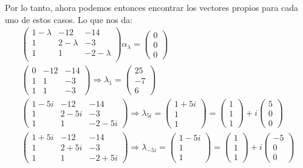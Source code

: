 \documentclass[12pt]{exam}
\begin{document}
\begin{enumerate}
\begin{enumerate}
    Por lo tanto, ahora podemos entonces encontrar los vectores propios para cada uno de estos casos. Lo que nos
    da:
    \begin{align*}
        \begin{pmatrix} 
            1 - \lambda & -12 & -14 \\
            1 & 2 - \lambda & -3 \\
            1 & 1 & - 2 - \lambda\\
        \end{pmatrix} \alpha_\lambda = \begin{pmatrix} 0\\0\\0 \end{pmatrix} \\
        \begin{pmatrix} 
            0 & -12 & -14 \\
            1 & 1 & -3 \\
            1 & 1 & -3
        \end{pmatrix} \Rightarrow \lambda_1 = \begin{pmatrix} 25 \\ -7 \\ 6 \end{pmatrix} \\
        \begin{pmatrix} 
            1 - 5i & -12 & -14 \\
            1 & 2 - 5i & -3 \\
            1 & 1 & -2 - 5i
        \end{pmatrix} \Rightarrow \lambda_{5i} = \begin{pmatrix} 1 + 5i \\ 1 \\ 1 \end{pmatrix} = \begin{pmatrix}  1 \\ 1 \\ 1 \end{pmatrix} + i\begin{pmatrix} 5 \\ 0 \\ 0 \end{pmatrix}  \\
        \begin{pmatrix} 
            1 + 5i & -12 & -14 \\
            1 & 2 + 5i & -3 \\
            1 & 1 & -2 + 5i
        \end{pmatrix} \Rightarrow \lambda_{-5i} = \begin{pmatrix} 1-5i \\ 1 \\ 1 \end{pmatrix} = \begin{pmatrix} 1 \\ 1 \\ 1 \end{pmatrix} +i \begin{pmatrix} -5 \\ 0 \\ 0 \end{pmatrix} 

\end{align*}
\end{enumerate}
\end{enumerate}
\end{document}
